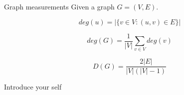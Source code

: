 \documentclass{beamer}
\begin{document}

    \begin{frame}{Graph measurements}
        Given a graph $G = (V, E)$.

        \begin{equation}
            deg(u) = |\{v \in V : (u, v) \in E\}|
            \label{eq:degree_undirected}
        \end{equation}
        
        \begin{equation}
            deg(G) = \frac{1}{|V|}\sum_{v \in V}deg(v)
            \label{eq:degree_distribution}
        \end{equation}

        \begin{equation}
            D(G) = \frac{2|E|}{|V|(|V| - 1)}
            \label{eq:density}
        \end{equation}
        
        \begin{note}
            {Introduce your self}
        \end{note}
    \end{frame}
    
\end{document}
